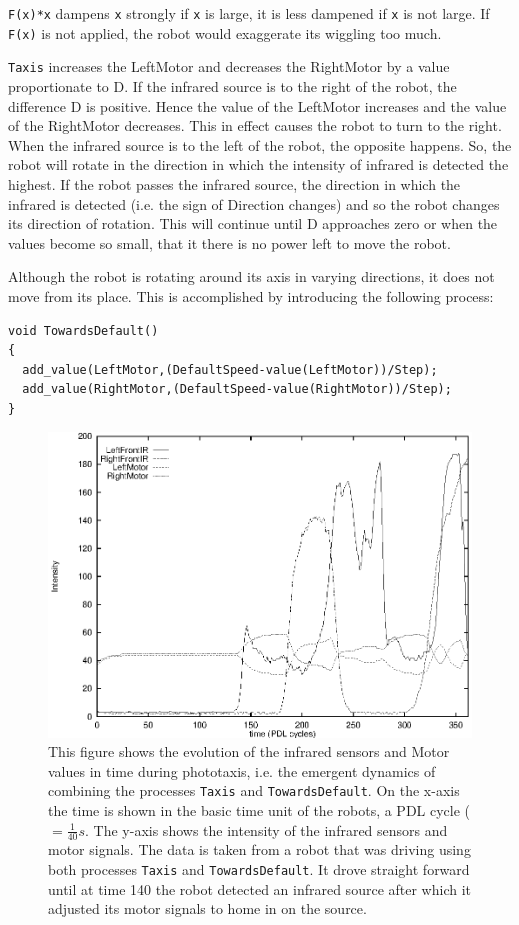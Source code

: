 \texttt{F(x)*x} dampens \texttt{x} strongly if \texttt{x} is large, it is less dampened if \texttt{x} is not large. If \texttt{F(x)} is not applied, the robot would exaggerate its wiggling too much.


\texttt{Taxis} increases the LeftMotor and decreases the RightMotor by a value proportionate to D. If the infrared source is to the right of the robot, the difference D is positive. Hence the value of the LeftMotor increases and the value of the RightMotor decreases. This in effect causes the robot to turn to the right. When the infrared source is to the left of the robot, the opposite happens. So, the robot will rotate in the direction in which the intensity of infrared is detected the highest. If the robot passes the infrared source, the direction in which the infrared is detected (i.e. the sign of Direction changes) and so the robot changes its direction of rotation. This will continue until D approaches zero or when the values become so small, that it there is no power left to move the robot.

Although the robot is rotating around its axis in varying directions, it does not move from its place. This is accomplished by introducing the following process:


{\footnotesize\begin{verbatim}
void TowardsDefault()
{
  add_value(LeftMotor,(DefaultSpeed-value(LeftMotor))/Step);
  add_value(RightMotor,(DefaultSpeed-value(RightMotor))/Step);
}
\end{verbatim}}


\begin{figure}
\centerline{\includegraphics[width=12cm]{robots//irtaxis.eps}}
\caption{This figure shows the evolution of the infrared sensors and Motor values in time during phototaxis, i.e. the emergent dynamics of combining the processes \texttt{Taxis} and \texttt{TowardsDefault}. On the x-axis the time is shown in the basic time unit of the robots, a PDL cycle ($= \frac{1}{40} s$. The y-axis shows the intensity of the infrared sensors and motor signals. The data is taken from a robot that was driving using both processes \texttt{Taxis} and \texttt{TowardsDefault}. It drove straight forward until at time 140 the robot detected an infrared source after which it adjusted its motor signals to home in on the source.}
\label{f:irtaxis}
\end{figure}




